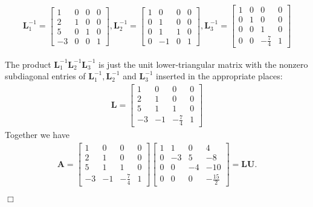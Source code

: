 \documentclass[UTF8,12pt,hyperref]{ctexart}
\newenvironment{solve}[1][\color{blue}\bf Solve]{\begin{trivlist}
\item[\hskip \labelsep {\color{blue}\bfseries
#1}]}{\hfill$\Box$\end{trivlist}}
\begin{document}
\begin{solve}
\begin{align*}
  \boldsymbol{L}_1^{-1} = 
  \left[\begin{array}{rrrr}
    1 & 0 & 0 & 0  \\
    2 & 1 & 0 & 0 \\
    5 &0 & 1 & 0  \\
    -3 & 0 & 0 & 1
    \end{array}\right],
    \boldsymbol{L}_2^{-1} = 
    \left[\begin{array}{rrrr}
      1 & 0 & 0 & 0  \\
      0 & 1 & 0 & 0 \\
      0 & 1 & 1 & 0  \\
      0 & -1 & 0 & 1
      \end{array}\right],
    \boldsymbol{L}_3^{-1} = 
      \left[\begin{array}{rrrr}
        1 & 0 & 0 & 0  \\
        0 & 1 & 0 & 0 \\
        0 & 0 & 1 & 0  \\
        0 & 0 & -\frac{7}{4} & 1
        \end{array}\right]
\end{align*}

The product $\boldsymbol{L}_1^{-1}\boldsymbol{L}_2^{-1}\boldsymbol{L}_3^{-1}$
is just the unit lower-triangular matrix with the nonzero
subdiagonal entries of $\boldsymbol{L}_1^{-1},\boldsymbol{L}_2^{-1}$ and $\boldsymbol{L}_3^{-1}$ 
inserted in the appropriate places:
\begin{align*}
  \boldsymbol{L} = \left[\begin{array}{rrrr}
    1 & 0 & 0 & 0  \\
    2 & 1 & 0 & 0 \\
    5 & 1 & 1 & 0  \\
    -3 & -1 & -\frac{7}{4} & 1
    \end{array}\right]
\end{align*}
Together we have
\begin{align*}
  \boldsymbol{A} = 
  \left[\begin{array}{rrrr}
    1 & 0 & 0 & 0  \\
    2 & 1 & 0 & 0 \\
    5 & 1 & 1 & 0  \\
    -3 & -1 & -\frac{7}{4} & 1
    \end{array}\right]\left[\begin{array}{rrrr}
      1 & 1 & 0 & 4  \\
      0 & -3 & 5 & -8 \\
      0 & 0 & -4 & -10  \\
      0 & 0 & 0 & -\frac{15}{2}
      \end{array}\right]=\boldsymbol{L}\boldsymbol{U}.
\end{align*}

\end{solve}
\end{document}
